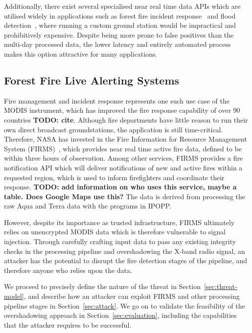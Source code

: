 Additionally, there exist several specialised near real time data APIs which are utilised widely in applications such as forest fire incident response~\cite{nasaFirms} and flood detection~\cite{nasaFlood}, where running a custom ground station would be impractical and prohibitively expensive.
Despite being more prone to false positives than the multi-day processed data, the lower latency and entirely automated process makes this option attractive for many applications.

\subsection{Forest Fire Live Alerting Systems}

Fire management and incident response represents one such use case of the MODIS instrument, which has improved the fire response capability of over 90 countries \textbf{TODO: cite}.
Although fire departments have little reason to run their own direct broadcast groundstations, the application is still time-critical.
Therefore, NASA has invested in the Fire Information for Resource Management System (FIRMS)~\cite{firmsIndex}, which provides near real time active fire data, defined to be within three hours of observation.
Among other services, FIRMS provides a fire notification API which will deliver notifications of new and active fires within a requested region, which is used to inform firefighters and coordinate their response.
\textbf{TODO: add information on who uses this service, maybe a table. Does Google Maps use this?}
The data is derived from processing the raw Aqua and Terra data with the programs in IPOPP.

However, despite its importance as trusted infrastructure, FIRMS ultimately relies on unencrypted MODIS data which is therefore vulnerable to signal injection.
Through carefully crafting input data to pass any existing integrity checks in the processing pipeline and overshadowing the X-band radio signal, an attacker has the potential to disrupt the fire detection stages of the pipeline, and therefore anyone who relies upon the data.

We proceed to precisely define the nature of the threat in Section~\ref{sec:threat-model}, and describe how an attacker can exploit FIRMS and other processing pipeline stages in Section~\ref{sec:attack}.
We go on to validate the feasibility of the overshadowing approach in Section~\ref{sec:evaluation}, including the capabilities that the attacker requires to be successful.
